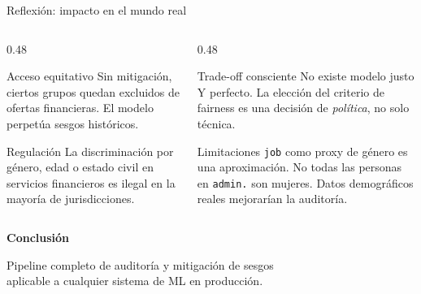 \documentclass[aspectratio=169, 11pt]{beamer}
\begin{document}
\begin{frame}{Reflexión: impacto en el mundo real}
\begin{columns}[T]
\begin{column}{0.48\textwidth}
\begin{block}{\faUniversity\quad Acceso equitativo}
Sin mitigación, ciertos grupos quedan excluidos de ofertas financieras. El modelo perpetúa sesgos históricos.
\end{block}
\vspace{4pt}
\begin{block}{\faGavel\quad Regulación}
La discriminación por género, edad o estado civil en servicios financieros es ilegal en la mayoría de jurisdicciones.
\end{block}
\end{column}
\begin{column}{0.48\textwidth}
\begin{block}{\faCogs\quad Trade-off consciente}
No existe modelo justo Y perfecto. La elección del criterio de fairness es una decisión de \emph{política}, no solo técnica.
\end{block}
\vspace{4pt}
\begin{block}{\faExclamationTriangle\quad Limitaciones}
\texttt{job} como proxy de género es una aproximación. No todas las personas en \texttt{admin.} son mujeres. Datos demográficos reales mejorarían la auditoría.
\end{block}
\end{column}
\end{columns}
\end{frame}

{
\begin{frame}[plain]
\vfill
\begin{center}
{\color{white}\LARGE\bfseries Conclusión}\\[12pt]
\vspace{16pt}

{\color{azulclaro}\large Pipeline completo de auditoría y mitigación de sesgos\\[6pt]
aplicable a cualquier sistema de ML en producción.}
\end{center}
\vfill
\end{frame}
}
\end{document}
